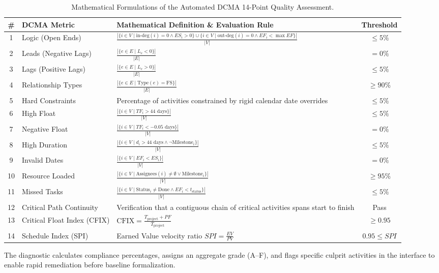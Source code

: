 \begin{table}[H]
\centering
\scriptsize
\renewcommand{\arraystretch}{0.90}
\caption*{Mathematical Formulations of the Automated DCMA 14-Point Quality Assessment.}
\begin{tabularx}{\textwidth}{c l X c}
\toprule
\textbf{\#} & \textbf{DCMA Metric} & \textbf{Mathematical Definition \& Evaluation Rule} & \textbf{Threshold} \\
\midrule
1 & Logic (Open Ends) & $\frac{|\{i \in V \mid \text{in-deg}(i)=0 \land ES_i>0\} \cup \{i \in V \mid \text{out-deg}(i)=0 \land EF_i < \max EF\}|}{|V|}$ & $\le 5\%$ \\
2 & Leads (Negative Lags) & $\frac{|\{e \in E \mid L_e < 0\}|}{|E|}$ & $= 0\%$ \\
3 & Lags (Positive Lags) & $\frac{|\{e \in E \mid L_e > 0\}|}{|E|}$ & $\le 5\%$ \\
4 & Relationship Types & $\frac{|\{e \in E \mid \text{Type}(e) = \text{FS}\}|}{|E|}$ & $\ge 90\%$ \\
5 & Hard Constraints & Percentage of activities constrained by rigid calendar date overrides & $\le 5\%$ \\
6 & High Float & $\frac{|\{i \in V \mid TF_i > 44 \text{ days}\}|}{|V|}$ & $\le 5\%$ \\
7 & Negative Float & $\frac{|\{i \in V \mid TF_i < -0.05 \text{ days}\}|}{|V|}$ & $= 0\%$ \\
8 & High Duration & $\frac{|\{i \in V \mid d_i > 44 \text{ days} \land \neg \text{Milestone}_i\}|}{|V|}$ & $\le 5\%$ \\
9 & Invalid Dates & $\frac{|\{i \in V \mid EF_i < ES_i\}|}{|V|}$ & $= 0\%$ \\
10 & Resource Loaded & $\frac{|\{i \in V \mid \text{Assignees}(i) \ne \emptyset \lor \text{Milestone}_i\}|}{|V|}$ & $\ge 95\%$ \\
11 & Missed Tasks & $\frac{|\{i \in V \mid \text{Status}_i \ne \text{Done} \land EF_i < t_{\text{status}}\}|}{|V|}$ & $\le 5\%$ \\
12 & Critical Path Continuity & Verification that a contiguous chain of critical activities spans start to finish & Pass \\
13 & Critical Float Index (CFIX) & $\text{CFIX} = \frac{T_{\text{project}} + PF}{T_{\text{project}}}$ & $\ge 0.95$ \\
14 & Schedule Index (SPI) & Earned Value velocity ratio $SPI = \frac{EV}{PV}$ & $0.95 \le SPI$ \\
\bottomrule
\end{tabularx}
\end{table}

The diagnostic calculates compliance percentages, assigns an aggregate grade (A--F), and flags specific culprit activities in the interface to enable rapid remediation before baseline formalization.
